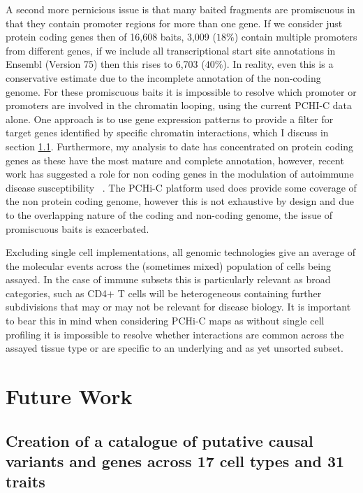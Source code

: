 \documentclass[a4paper,11pt]{report}
\begin{document}
A second more pernicious issue is that many baited fragments are promiscuous in that they contain promoter regions for more than one gene. If we consider just protein coding genes then of 16,608 baits, 3,009 ($18\%$) contain multiple promoters from different genes, if we include all transcriptional start site annotations in Ensembl (Version 75) then this rises to 6,703 ($40\%$). In reality, even this is a conservative estimate due to the incomplete annotation of the non-coding genome. For these promiscuous baits it is impossible to resolve which promoter or promoters are involved in the chromatin looping, using the current PCHI-C data alone. One approach is to use gene expression patterns to provide a filter for target genes identified by specific chromatin interactions, which I discuss in section \ref{sect:mo_celltypes}. Furthermore, my analysis to date has concentrated on protein coding genes as these have the most mature and complete annotation, however,  recent work has suggested a role for non coding genes in the modulation of autoimmune disease susceptibility ~\citep{Castellanos-RubioFernandez-JimenezKratchmarovEtAl2016}. The PCHi-C platform used does provide some coverage of the non protein coding genome, however this is not exhaustive by design and due to the overlapping nature of the coding and non-coding genome, the issue of promiscuous baits is exacerbated.

Excluding single cell implementations, all genomic technologies give an average of the molecular events across the (sometimes mixed) population of cells being assayed. In the case of immune subsets this is particularly relevant as broad categories, such as CD4$+$ T cells will be heterogeneous containing further subdivisions that may or may not be relevant for disease biology. It is important to bear this in mind when considering PCHi-C maps as without single cell profiling it is impossible to resolve whether interactions are common across the assayed tissue type or are specific to an underlying and as yet unsorted subset.



\chapter{Future Work}

\section{Creation of a catalogue of putative causal variants and genes across 17 cell types and 31 traits}
\label{sect:mo_celltypes}
\end{document}
